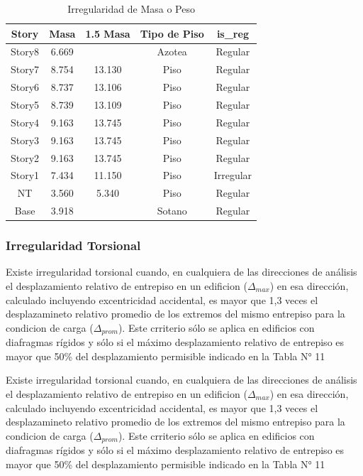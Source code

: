\documentclass{article}%
\begin{document}
\begin{table}[h!]%
\centering%
\caption{Irregularidad de Masa o Peso}%
\begin{tabular}{ccccc}
\toprule
Story & Masa & 1.5 Masa & Tipo de Piso & is\_reg \\
\midrule
Story8 & 6.669 &  & Azotea & Regular \\
Story7 & 8.754 & 13.130 & Piso & Regular \\
Story6 & 8.737 & 13.106 & Piso & Regular \\
Story5 & 8.739 & 13.109 & Piso & Regular \\
Story4 & 9.163 & 13.745 & Piso & Regular \\
Story3 & 9.163 & 13.745 & Piso & Regular \\
Story2 & 9.163 & 13.745 & Piso & Regular \\
Story1 & 7.434 & 11.150 & Piso & Irregular \\
NT & 3.560 & 5.340 & Piso & Regular \\
Base & 3.918 &  & Sotano & Regular \\
\bottomrule
\end{tabular}
%
\end{table}

%
\subsubsection{Irregularidad Torsional}%
\label{ssubsec:IrregularidadTorsional}%
\begin{tcolorbox}[colback=gray!5!white,colframe=cyan!75!black,fonttitle=\bfseries,title=Tabla N°9 E-030]%
Existe irregularidad torsional cuando, en cualquiera de las direcciones de análisis el desplazamiento relativo de entrepiso en un edificion ($\Delta_{max}$) en esa dirección, calculado incluyendo excentricidad accidental, es mayor que 1,3 veces el desplazamineto relativo promedio de los extremos del mismo entrepiso para la condicion de carga ($\Delta_{prom}$). 
 Este crriterio sólo se aplica en edificios con diafragmas rígidos y sólo si el máximo desplazamiento relativo de entrepiso es mayor que 50\% del desplazamiento permisible indicado en la Tabla N° 11%
\end{tcolorbox}%
\begin{tcolorbox}[colback=gray!5!white,colframe=cyan!75!black,fonttitle=\bfseries,title=Tabla N°9 E-030]%
Existe irregularidad torsional cuando, en cualquiera de las direcciones de análisis el desplazamiento relativo de entrepiso en un edificion ($\Delta_{max}$) en esa dirección, calculado incluyendo excentricidad accidental, es mayor que 1,3 veces el desplazamineto relativo promedio de los extremos del mismo entrepiso para la condicion de carga ($\Delta_{prom}$). 
 Este crriterio sólo se aplica en edificios con diafragmas rígidos y sólo si el máximo desplazamiento relativo de entrepiso es mayor que 50\% del desplazamiento permisible indicado en la Tabla N° 11%
\end{tcolorbox}%
\end{document}
